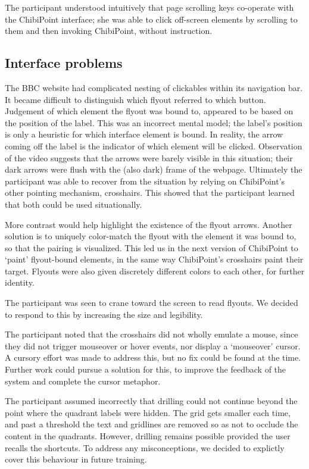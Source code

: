 \documentclass[11pt,openright,a4paper]{report}
\begin{document}
The participant understood intuitively that page scrolling keys co-operate with the ChibiPoint interface; she was able to click off-screen elements by scrolling to them and then invoking ChibiPoint, without instruction.

\subsection{Interface problems}
The BBC website had complicated nesting of clickables within its navigation bar. It became difficult to distinguish which flyout referred to which button. Judgement of which element the flyout was bound to, appeared to be based on the position of the label. This was an incorrect mental model; the label's position is only a heuristic for which interface element is bound. In reality, the arrow coming off the label is the indicator of which element will be clicked. Observation of the video suggests that the arrows were barely visible in this situation; their dark arrows were flush with the (also dark) frame of the webpage. Ultimately the participant was able to recover from the situation by relying on ChibiPoint's other pointing mechanism, crosshairs. This showed that the participant learned that both could be used situationally.

More contrast would help highlight the existence of the flyout arrows. Another solution is to uniquely color-match the flyout with the element it was bound to, so that the pairing is visualized. This led us in the next version of ChibiPoint to `paint' flyout-bound elements, in the same way ChibiPoint's crosshairs paint their target. Flyouts were also given discretely different colors to each other, for further identity.

The participant was seen to crane toward the screen to read flyouts. We decided to respond to this by increasing the size and legibility.

The participant noted that the crosshairs did not wholly emulate a mouse, since they did not trigger mouseover or hover events, nor display a `mouseover' cursor. A cursory effort was made to address this, but no fix could be found at the time. Further work could pursue a solution for this, to improve the feedback of the system and complete the cursor metaphor.

The participant assumed incorrectly that drilling could not continue beyond the point where the quadrant labels were hidden. The grid gets smaller each time, and past a threshold the text and gridlines are removed so as not to occlude the content in the quadrants. However, drilling remains possible provided the user recalls the shortcuts. To address any misconceptions, we decided to explictly cover this behaviour in future training.
\end{document}
